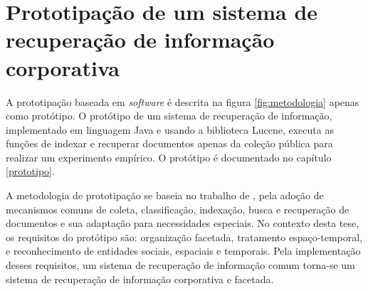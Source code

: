 

\section{Prototipação de um sistema de recuperação de informação corporativa}

A prototipação baseada em \textit{software} é descrita na figura \ref{fig:metodologia} apenas como protótipo. O protótipo de um sistema de recuperação de informação, implementado em linguagem Java e usando a biblioteca Lucene, executa as funções de indexar e recuperar documentos apenas da coleção pública para realizar um experimento empírico. O protótipo é documentado no capítulo \ref{prototipo}.

A metodologia de prototipação se baseia no trabalho de , pela adoção de mecanismos comuns de coleta, classificação, indexação, busca e recuperação de documentos e sua adaptação para necessidades especiais. No contexto desta tese, os requisitos do protótipo são: organização facetada, tratamento espaço-temporal, e reconhecimento de entidades sociais, espaciais e temporais. Pela implementação desses requisitos, um sistema de recuperação de informação comum torna-se um sistema de recuperação de informação corporativa e facetada.

